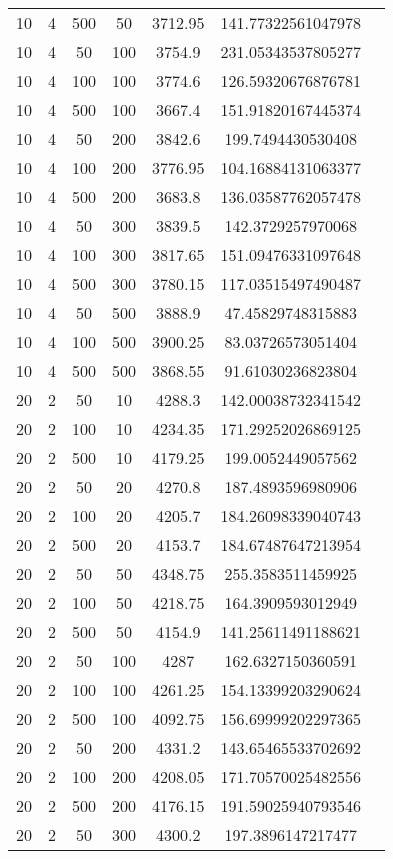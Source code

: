 {\begin{longtabu}{S
S
S
S
S
S[round-mode=places,round-precision=0]
S[round-mode=places,round-precision=0]}
10 & 4 & 500 & 50 & 3712.95 & 141.77322561047978 \\
10 & 4 & 50 & 100 & 3754.9 & 231.05343537805277 \\
10 & 4 & 100 & 100 & 3774.6 & 126.59320676876781 \\
10 & 4 & 500 & 100 & 3667.4 & 151.91820167445374 \\
10 & 4 & 50 & 200 & 3842.6 & 199.7494430530408 \\
10 & 4 & 100 & 200 & 3776.95 & 104.16884131063377 \\
10 & 4 & 500 & 200 & 3683.8 & 136.03587762057478 \\
10 & 4 & 50 & 300 & 3839.5 & 142.3729257970068 \\
10 & 4 & 100 & 300 & 3817.65 & 151.09476331097648 \\
10 & 4 & 500 & 300 & 3780.15 & 117.03515497490487 \\
10 & 4 & 50 & 500 & 3888.9 & 47.45829748315883 \\
10 & 4 & 100 & 500 & 3900.25 & 83.03726573051404 \\
10 & 4 & 500 & 500 & 3868.55 & 91.61030236823804 \\
20 & 2 & 50 & 10 & 4288.3 & 142.00038732341542 \\
20 & 2 & 100 & 10 & 4234.35 & 171.29252026869125 \\
20 & 2 & 500 & 10 & 4179.25 & 199.0052449057562 \\
20 & 2 & 50 & 20 & 4270.8 & 187.4893596980906 \\
20 & 2 & 100 & 20 & 4205.7 & 184.26098339040743 \\
20 & 2 & 500 & 20 & 4153.7 & 184.67487647213954 \\
20 & 2 & 50 & 50 & 4348.75 & 255.3583511459925 \\
20 & 2 & 100 & 50 & 4218.75 & 164.3909593012949 \\
20 & 2 & 500 & 50 & 4154.9 & 141.25611491188621 \\
20 & 2 & 50 & 100 & 4287 & 162.6327150360591 \\
20 & 2 & 100 & 100 & 4261.25 & 154.13399203290624 \\
20 & 2 & 500 & 100 & 4092.75 & 156.69999202297365 \\
20 & 2 & 50 & 200 & 4331.2 & 143.65465533702692 \\
20 & 2 & 100 & 200 & 4208.05 & 171.70570025482556 \\
20 & 2 & 500 & 200 & 4176.15 & 191.59025940793546 \\
20 & 2 & 50 & 300 & 4300.2 & 197.3896147217477 \\

\end{longtabu}}
